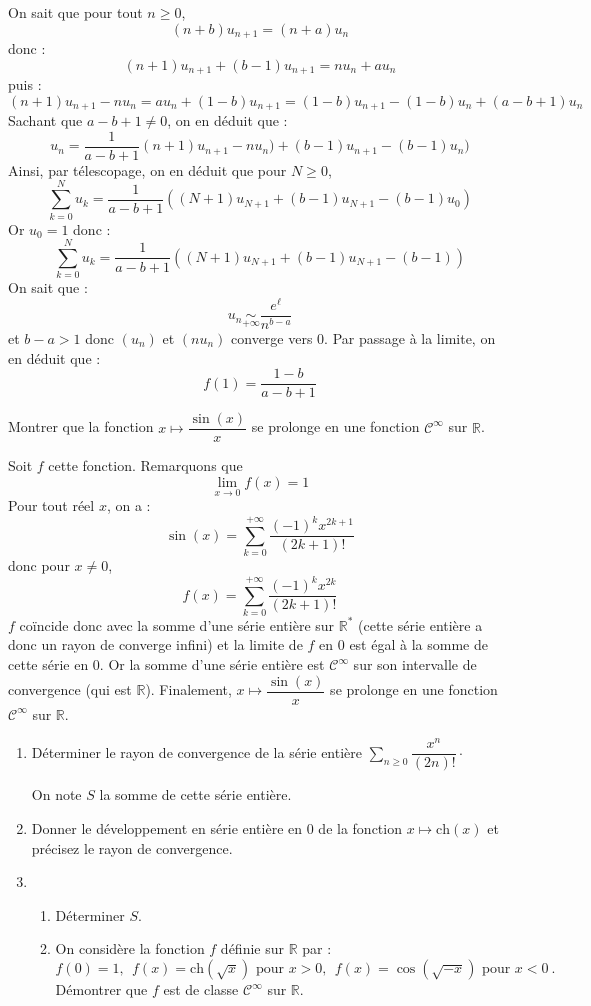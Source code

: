 \documentclass[a4paper,10pt]{report}
\newcommand{\Sum}[2]{\ensuremath{\textstyle{\sum\limits_{#1}^{#2}}}}
\begin{document}
\begin{corr}
\begin{enumerate}
\medskip

\noindent On sait que pour tout $n \geq 0$,
$$ (n+b) u_{n+1} = (n+a) u_n$$
donc :
$$ (n+1) u_{n+1} + (b-1) u_{n+1} = n u_n + au_n $$
puis :
$$ (n+1) u_{n+1}- n u_n = a u_n + (1-b) u_{n+1} = (1-b) u_{n+1} - (1-b) u_n +  (a-b+1) u_n$$
Sachant que $a-b+1 \neq 0$, on en déduit que :
$$ u_n = \dfrac{1}{a-b+1} (n+1) u_{n+1}- n u_n ) + (b-1) u_{n+1} - (b-1) u_n)$$
Ainsi, par télescopage, on en déduit que pour $N \geq 0$,
$$ \sum_{k=0}^N u_k = \dfrac{1}{a-b+1}  ( (N+1) u_{N+1} +(b-1) u_{N+1} - (b-1)u_0 )$$
Or $u_0=1$ donc : 
$$  \sum_{k=0}^N u_k = \dfrac{1}{a-b+1}  ( (N+1) u_{N+1} +(b-1) u_{N+1} - (b-1))$$
On sait que :
$$ u_n \underset{+ \infty}{\sim} \dfrac{e^{\ell}}{n^{b-a}}$$
et $b-a>1$ donc $(u_n)$ et $(nu_n)$ converge vers $0$. Par passage à la limite, on en déduit que :
$$ f(1) = \dfrac{1-b}{a-b+1}$$
\end{enumerate}
\end{corr}



\begin{Exa} Montrer que la fonction $x \mapsto \dfrac{\sin(x)}{x}$ se prolonge en une fonction $\mathcal{C}^{\infty}$ sur $\mathbb{R}$.
\end{Exa}

\corr Soit $f$ cette fonction. Remarquons que 
$$ \lim_{x \rightarrow 0} f(x) = 1$$
Pour tout réel $x$, on a :
$$ \sin(x) = \sum_{k=0}^{+ \infty} \dfrac{(-1)^k x^{2k+1}}{(2k+1)!}$$
donc pour $x \neq 0$,
$$ f(x) = \sum_{k=0}^{+ \infty} \dfrac{(-1)^k x^{2k}}{(2k+1)!}$$
$f$ coïncide donc avec la somme d'une série entière sur $\mathbb{R}^*$ (cette série entière a donc un rayon de converge infini) et la limite de $f$ en $0$ est égal à la somme de cette série en $0$. Or la somme d'une série entière est $\mathcal{C}^{\infty}$ sur son intervalle de convergence (qui est $\mathbb{R}$). Finalement, $x \mapsto \dfrac{\sin(x)}{x}$ se prolonge en une fonction $\mathcal{C}^{\infty}$ sur $\mathbb{R}$.

\begin{Exa} \begin{enumerate}
\item Déterminer le rayon de convergence de la série entière $\Sum{n \geq 0}{} \dfrac{x^n}{(2n)!} \cdot$

\noindent On note $S$ la somme de cette série entière.
\item Donner le développement en série entière en 0 de la fonction $x\mapsto \text{ch}(x)$  et précisez le rayon de convergence.
\item \begin{enumerate}
	\item Déterminer $S$.
	\item On considère la fonction $f$ définie sur $\mathbb{R}$ par :
	\begin{equation*}
	f(0)=1,\ \ f(x)=\text{ch}(\sqrt x)\text{ pour $x>0$},\ \ f(x)=\cos(\sqrt{-x})\text{ pour $x<0$}\ .
	\end{equation*}
	Démontrer que $f$ est de classe $\mathcal{C}^{\infty}$ sur $\mathbb{R}$.
	\end{enumerate}
\end{enumerate}
\end{Exa}
\end{document}
